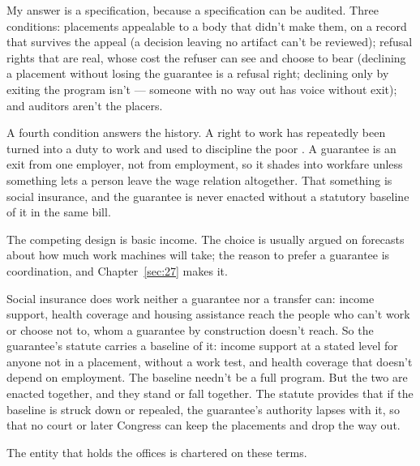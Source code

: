 My answer is a specification, because a specification can be audited. Three conditions: placements appealable to a body that didn't make them, on a record that survives the appeal (a decision leaving no artifact can't be reviewed); refusal rights that are real, whose cost the refuser can see and choose to bear (declining a placement without losing the guarantee is a refusal right; declining only by exiting the program isn't — someone with no way out has voice without exit); and auditors aren't the placers.

A fourth condition answers the history. A right to work has repeatedly been turned into a duty to work and used to discipline the poor \autocite{anderson2023hijacked}. A guarantee is an exit from one employer, not from employment, so it shades into workfare unless something lets a person leave the wage relation altogether. That something is social insurance, and the guarantee is never enacted without a statutory baseline of it in the same bill.

The competing design is basic income. The choice is usually argued on forecasts about how much work machines will take; the reason to prefer a guarantee is coordination, and Chapter~\ref{sec:27} makes it.

Social insurance does work neither a guarantee nor a transfer can: income support, health coverage and housing assistance reach the people who can't work or choose not to, whom a guarantee by construction doesn't reach. So the guarantee's statute carries a baseline of it: income support at a stated level for anyone not in a placement, without a work test, and health coverage that doesn't depend on employment. The baseline needn't be a full program. But the two are enacted together, and they stand or fall together. The statute provides that if the baseline is struck down or repealed, the guarantee's authority lapses with it, so that no court or later Congress can keep the placements and drop the way out.


The entity that holds the offices is chartered on these terms.

